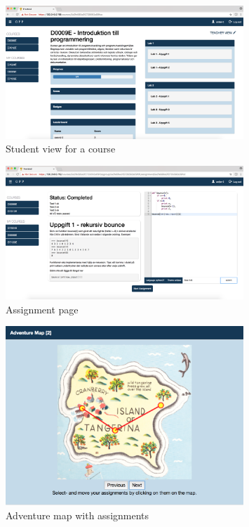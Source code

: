 \begin{figure}[H]
\centering
\includegraphics[width=0.8\textwidth]{img/gppinpictures/studentview.png}
\caption{Student view for a course}
\label{fig:student}
\end{figure}

\begin{figure}[H]
\centering
\includegraphics[width=0.8\textwidth]{img/gppinpictures/assignment.png}
\caption{Assignment page}
\label{fig:assignment}
\end{figure}

\begin{figure}[H]
\centering
\includegraphics[width=0.8\textwidth]{img/gppinpictures/adventuremap.png}
\caption{Adventure map with assignments}
\label{fig:adventuremap}
\end{figure}


